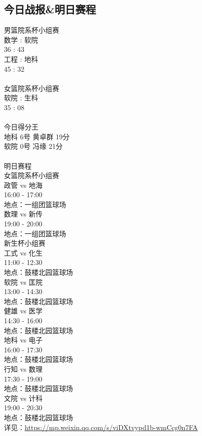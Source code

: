 \documentclass[letterpaper, 12pt]{article}
\begin{document}
\begin{multicols}{2}
\subsection{今日战报\&明日赛程}
男篮院系杯小组赛
\\数学   :   软院
\\36   :   43
\\工程   :   地科
\\45   :   32
\\
\\女篮院系杯小组赛
\\软院   :   生科
\\35   :   08
\\
\\今日得分王
\\地科 6号 黄卓群 19分
\\软院 0号 冯缘 21分
\\
\\明日赛程
\\女篮院系杯小组赛
\\政管 vs 地海
\\16:00 - 17:00
\\地点：一组团篮球场
\\数理 vs 新传
\\19:00 - 20:00
\\地点：一组团篮球场
\\新生杯小组赛
\\工式 vs 化生
\\11:00 - 12:30
\\地点：鼓楼北园篮球场
\\软院 vs 匡院
\\13:00 - 14:30
\\地点：鼓楼北园篮球场
\\健雄 vs 医学
\\14:30 - 16:00
\\地点：鼓楼北园篮球场
\\地科 vs 电子
\\16:00 - 17:30
\\地点：鼓楼北园篮球场
\\行知 vs 数理
\\17:30 - 19:00
\\地点：鼓楼北园篮球场
\\文院 vs 计科
\\19:00 - 20:30
\\地点：鼓楼北园篮球场
\\详见：\url{https://mp.weixin.qq.com/s/viDXtvypd1b-wmCcg0n7FA}
\end{multicols}
\end{document}
